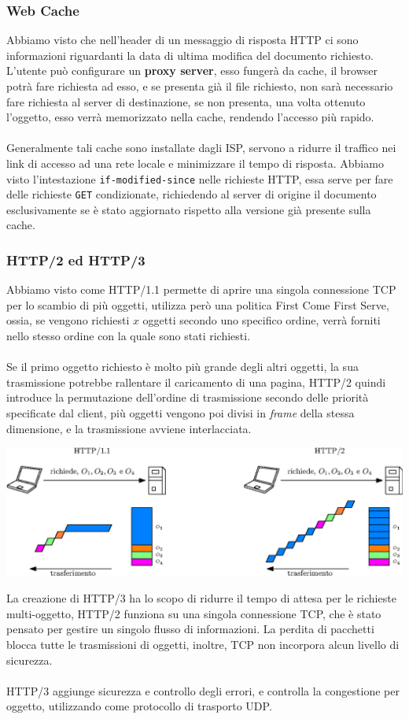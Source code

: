 \documentclass[12pt, letterpaper]{article}
\newcommand{\code}[1]{\colorbox{light-gray}{\texttt{#1}}}
\newcommand{\acc}{\\\hphantom{}\\}
\begin{document}
\subsubsection{Web Cache}
Abbiamo visto che nell'header di un messaggio di risposta HTTP ci sono informazioni riguardanti la data 
di ultima modifica del documento richiesto. L'utente può configurare un \textbf{proxy server}, esso fungerà 
da cache, il browser potrà fare richiesta ad esso, e se presenta già il file richiesto, non sarà 
necessario fare richiesta al server di destinazione, se non presenta, una volta ottenuto l'oggetto, esso 
verrà memorizzato nella cache, rendendo l'accesso più rapido.\acc 
Generalmente tali cache sono installate dagli ISP, servono a ridurre il traffico nei link di accesso ad una rete 
locale e minimizzare il tempo di risposta. Abbiamo visto l'intestazione \code{if-modified-since} nelle richieste 
HTTP, essa serve per fare delle richieste \code{GET} condizionate, richiedendo al server di origine il
documento esclusivamente se è stato aggiornato rispetto alla versione già presente sulla cache. 
\subsubsection{HTTP/2 ed HTTP/3}
Abbiamo visto come HTTP/1.1 permette di aprire una singola connessione TCP per lo scambio di più 
oggetti, utilizza però una politica First Come First Serve, ossia, se vengono richiesti $x$ oggetti secondo 
uno specifico ordine, verrà forniti nello stesso ordine con la quale sono stati richiesti.\acc 
Se il primo oggetto richiesto è molto più grande degli altri oggetti, la sua trasmissione potrebbe 
rallentare il caricamento di una pagina, HTTP/2 quindi introduce la permutazione dell'ordine di trasmissione 
secondo delle priorità specificate dal client, più oggetti vengono poi divisi in \textit{frame} della 
stessa dimensione, e la trasmissione avviene interlacciata.\begin{center}
    \includegraphics[width=1\textwidth ]{images/http2.eps}
\end{center}
La creazione di HTTP/3 ha lo scopo di ridurre il tempo di attesa per le richieste multi-oggetto, HTTP/2 
funziona su una singola connessione TCP, che è stato pensato per gestire un singolo 
flusso di informazioni. La perdita di pacchetti blocca tutte le trasmissioni di oggetti,
inoltre, TCP non incorpora alcun livello di sicurezza. \acc 
HTTP/3 aggiunge sicurezza e controllo degli errori, e controlla la congestione per oggetto, utilizzando 
come protocollo di trasporto UDP.
\end{document}
